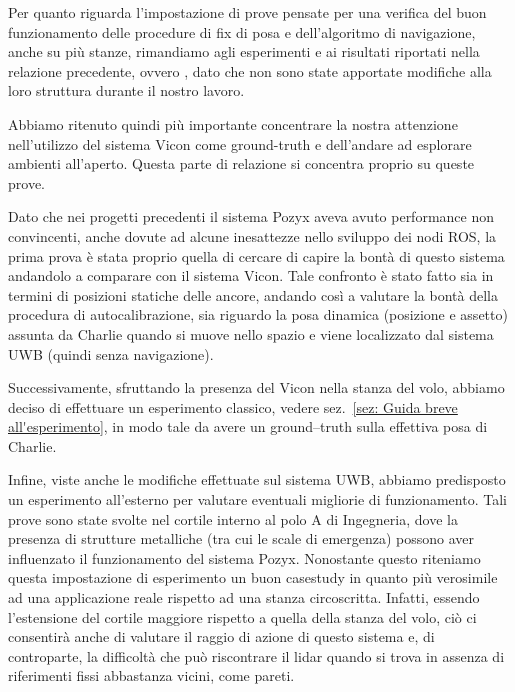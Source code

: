 Per quanto riguarda l'impostazione di prove pensate per una verifica del buon funzionamento delle procedure di fix di posa e dell'algoritmo di navigazione, anche su più stanze, rimandiamo agli esperimenti e ai risultati riportati nella relazione precedente, ovvero \cite{ptvlocalizzazione}, dato che non sono state apportate modifiche alla loro struttura durante il nostro lavoro. 

Abbiamo ritenuto quindi pi\`u importante concentrare la nostra attenzione nell'utilizzo del sistema Vicon come ground-truth e dell'andare ad esplorare ambienti all'aperto.
Questa parte di relazione si concentra proprio su queste prove. 

\vspace{0.5cm}
Dato che nei progetti precedenti il sistema Pozyx aveva avuto performance non convincenti, anche dovute ad alcune inesattezze nello sviluppo dei nodi ROS, la prima prova \`e stata proprio quella di cercare di capire la bont\`a di questo sistema andandolo a comparare con il sistema Vicon.
Tale confronto è stato fatto sia in termini di posizioni statiche delle ancore, andando così a valutare la bontà della procedura di autocalibrazione, sia riguardo la posa dinamica (posizione e assetto) assunta da Charlie quando si muove nello spazio e viene localizzato dal sistema UWB (quindi senza navigazione).

Successivamente, sfruttando la presenza del Vicon nella stanza del volo, abbiamo deciso di effettuare un esperimento classico, vedere sez.~\ref{sez: Guida breve all'esperimento}, in modo tale da avere un ground--truth sulla effettiva posa di Charlie.

Infine, viste anche le modifiche effettuate sul sistema UWB, abbiamo predisposto un esperimento all'esterno per valutare eventuali migliorie di funzionamento.
Tali prove sono state svolte nel cortile interno al polo A di Ingegneria, dove la presenza di strutture metalliche (tra cui le scale di emergenza) possono aver influenzato il funzionamento del sistema Pozyx. 
Nonostante questo riteniamo questa impostazione di esperimento un buon casestudy in quanto pi\`u verosimile ad una applicazione reale rispetto ad una stanza circoscritta. 
Infatti, essendo l'estensione del cortile maggiore rispetto a quella della stanza del volo, ciò ci consentirà anche di valutare il raggio di azione di questo sistema e, di controparte, la difficoltà che può riscontrare il lidar quando si trova in assenza di riferimenti fissi abbastanza vicini, come pareti.

